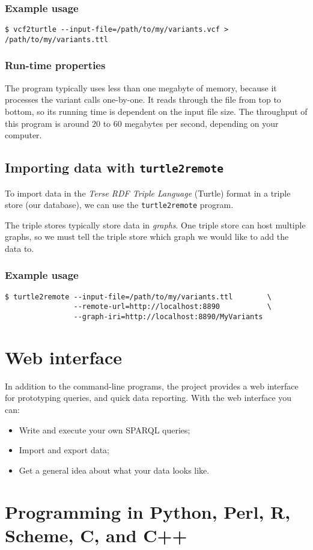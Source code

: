\documentclass[11pt,a4paper]{book}
\begin{document}
\subsection{Example usage}

\begin{verbatim}
$ vcf2turtle --input-file=/path/to/my/variants.vcf > /path/to/my/variants.ttl
\end{verbatim}

\subsection{Run-time properties}

  The program typically uses less than one megabyte of memory, because it
  processes the variant calls one-by-one.  It reads through the file from top
  to bottom, so its running time is dependent on the input file size.  The
  throughput of this program is around $20$ to $60$ megabytes per second,
  depending on your computer.

\section{Importing data with \texttt{turtle2remote}}
\label{sec:turtle2remote}

  To import data in the \emph{Terse RDF Triple Language} (Turtle) format in
  a triple store (our database), we can use the \texttt{turtle2remote} program.

  The triple stores typically store data in \emph{graphs}.  One triple store
  can host multiple graphs, so we must tell the triple store which graph we
  would like to add the data to.

\subsection{Example usage}

\begin{verbatim}
$ turtle2remote --input-file=/path/to/my/variants.ttl        \
                --remote-url=http://localhost:8890           \
                --graph-iri=http://localhost:8890/MyVariants
\end{verbatim}

\chapter{Web interface}

  In addition to the command-line programs, the project provides a web
  interface for prototyping queries, and quick data reporting.  With the
  web interface you can:
  \begin{itemize}
  \item Write and execute your own SPARQL queries;
  \item Import and export data;
  \item Get a general idea about what your data looks like.
  \end{itemize}

\chapter{Programming in Python, Perl, R, Scheme, C, and C++}
\end{document}
